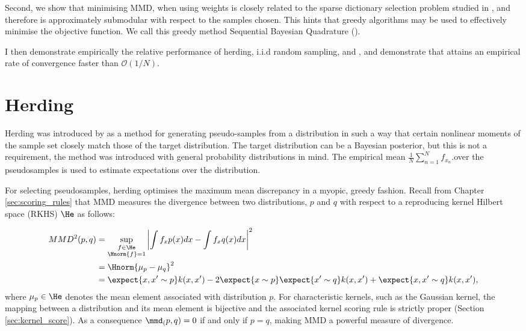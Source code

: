 Second, we show that minimising MMD, when using \bq{} weights is closely related to the sparse dictionary selection problem studied in \citep{KrauseCevher10}, and therefore is approximately submodular with respect to the samples chosen. This hints that greedy algorithms may be used to effectively minimise the objective function. We call this greedy method Sequential Bayesian Quadrature (\sbq{}).

I then demonstrate empirically the relative performance of herding, i.i.d random sampling, and \sbq{}, and demonstrate that \sbq{} attains an empirical rate of convergence faster than $\mathcal{O}(1/N)$.


\section{Herding} 

Herding was introduced by \citep{welling2009herding} as a method for generating pseudo-samples from a distribution in such a way that certain nonlinear moments of the sample set closely match those of the target distribution. The target distribution can be a Bayesian posterior, but this is not a requirement, the method was introduced with general probability distributions in mind. The empirical mean  $\frac{1}{N}\sum_{n=1}^{N}f_{x_n}$.over the pseudosamples is used to estimate expectations over the distribution.

For selecting pseudosamples, herding optimises the maximum mean discrepancy \citep[MMD;\ ][]{Sriperumbudur2008} in a myopic, greedy fashion. Recall from Chapter \ref{sec:scoring_rules} that MMD measures the divergence between two distributions, $p$ and $q$ with respect to a reproducing kernel Hilbert space (RKHS) $\He$ as follows:

\begin{align}
MMD^2(p,q) &= \sup_{\substack{f\in\He\\\Hnorm{f}=1}}\left\vert\int f_x p(x) dx - \int f_x q(x) dx\right\vert^2\label{eqn:rkhs-mmd}\\
	&= \Hnorm{\mu_{p} - \mu_{q}}^2\\
	&=  \expect{x,x'\sim p} k(x,x')	- 2 \expect{x\sim p}\expect{x'\sim q} k(x,x') + \expect{x,x'\sim q} k(x,x'),
\end{align}
%
where $\mu_{p}\in\He$ denotes the mean element associated with distribution $p$. For characteristic kernels, such as the Gaussian kernel, the mapping between a distribution and its mean element is bijective and the associated kernel scoring rule is strictly proper (Section \ref{sec:kernel_score}). As a consequence $\mmd_(p,q)=0$ if and only if $p=q$, making MMD a powerful measure of divergence.

